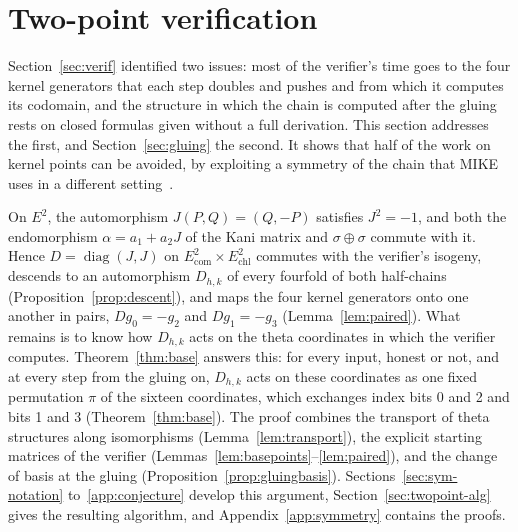 \documentclass[version=preprint]{iacrcc}
\newcommand{\Ecom}{E_{\mathrm{com}}}
\newcommand{\Echl}{E_{\mathrm{chl}}}
\begin{document}
    \section{Two-point verification}
    \label{sec:twopoint}

    Section~\ref{sec:verif} identified two issues: most of the verifier's time
    goes to the four kernel generators that each step doubles and pushes and
    from which it computes its codomain, and the structure in which the chain
    is computed after the gluing rests on closed formulas given without a full
    derivation. This
    section addresses the first, and Section~\ref{sec:gluing} the second. It
    shows that half of the work on
    kernel points can be avoided, by exploiting a symmetry of the chain that
    MIKE uses in a different setting~\cite[Appendix E.2]{BDD+26}.

    On $E^2$, the automorphism $J(P, Q) = (Q, -P)$ satisfies $J^2 = -1$, and
    both the endomorphism $\alpha = a_1 + a_2 J$ of the Kani matrix and
    $\sigma \oplus \sigma$ commute with it. Hence $D = \operatorname{diag}(J,
    J)$ on $\Ecom^2 \times \Echl^2$ commutes with the verifier's isogeny,
    descends to an automorphism $D_{h,k}$ of every fourfold of both
    half-chains (Proposition~\ref{prop:descent}), and maps the four kernel
    generators onto one another in pairs, $D g_0 = -g_2$ and $D g_1 = -g_3$
    (Lemma~\ref{lem:paired}). What remains is to know how $D_{h,k}$ acts on
    the theta coordinates in which the verifier computes. Theorem~\ref{thm:base}
    answers this: for every input, honest or not, and at every step from the
    gluing on, $D_{h,k}$ acts on these coordinates as one fixed permutation
    $\pi$ of the sixteen coordinates, which exchanges index bits 0 and 2 and
    bits 1 and 3 (Theorem~\ref{thm:base}). The proof combines the transport of
    theta structures along isomorphisms (Lemma~\ref{lem:transport}), the
    explicit starting matrices of the verifier
    (Lemmas~\ref{lem:basepoints}--\ref{lem:paired}), and the change of basis at
    the gluing (Proposition~\ref{prop:gluingbasis}). Sections~\ref{sec:sym-notation}
    to~\ref{app:conjecture} develop this argument,
    Section~\ref{sec:twopoint-alg} gives the resulting algorithm, and
    Appendix~\ref{app:symmetry} contains the proofs.
\end{document}

